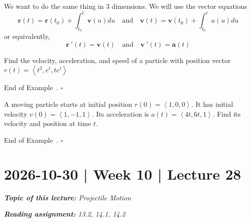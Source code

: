 \documentclass[10pt]{article}
\DeclareRobustCommand{\demph}[1]{%
  \ifmmode
  {\color{Blue}#1}%
  \else
  {\color{Blue}\bfseries\slshape #1}%
  \fi
}
\theoremstyle{definition}
\newtheorem{example}[theorem]{Example}
\renewenvironment{example}
{\begin{oldexample}}
  {\par\smallskip\hfill   End of Example~\theexample. $\square$    \par\end{oldexample}}
\newcommand{\1}[1]{\textbf{1}_{\left[#1\right]}} %
\begin{document}
We want to do the same thing in 3 dimensions. We will use the vector equations
\begin{equation*}
  \mathbf{r}(t) 
  = \mathbf{r}(t_{0}) + \int_{t_{0}}^{t}\mathbf{v}(u)du
  \quad \text{and} \quad
  \mathbf{v}(t) 
  = \mathbf{v}(t_{0}) + \int_{t_{0}}^{t}a(u)du  
\end{equation*}
or equivalently,
\begin{equation*}
  \mathbf{r}\ '(t) = \mathbf{v}(t)
  \quad \text{and} \quad 
  \mathbf{v}\ '(t) = \mathbf{a}(t)
\end{equation*}
\begin{example}
  Find the velocity, acceleration,  and speed of a particle with position vector $r(t) = \left\langle
    t^{2},e^{t},t e^{t} \right\rangle $
\end{example}

\begin{example}
  A moving particle starts at initial position $r(0)=\left\langle 1,0,0 \right\rangle$. It has initial
  velocity $v(0) = \left\langle 1,-1,1 \right\rangle$. Its acceleration is $a(t) = \left\langle 4t,6t,1
  \right\rangle$. Find its velocity and position at time $t$.
\end{example}

\newpage

\section{2026-10-30 | Week 10 | Lecture 28}

\begin{center}
  \begin{tcolorbox}[width=0.9\textwidth, colback=white, colframe=black]
    \textit{\textbf{Topic of this lecture:} Projectile Motion}

    \textit{\textbf{Reading assignment:} 13.2, 14.1, 14.2}
  \end{tcolorbox}
\end{center}

\end{document}
